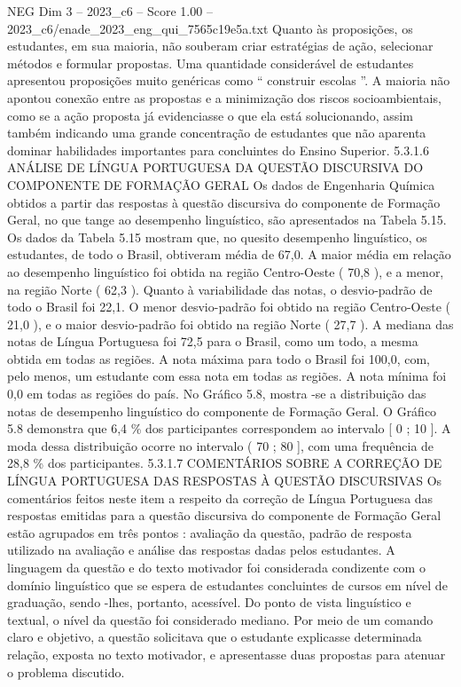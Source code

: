 \begin{textsample}{NEG Dim 3 – 2023\_c6 – Score 1.00 – 2023\_c6/enade\_2023\_eng\_qui\_7565c19e5a.txt}
Quanto às proposições, os estudantes, em sua maioria, não souberam criar estratégias de ação, selecionar métodos e formular propostas.
Uma quantidade considerável de estudantes apresentou proposições muito genéricas como “ construir escolas ”.
A maioria não apontou conexão entre as propostas e a minimização dos riscos socioambientais, como se a ação proposta já evidenciasse o que ela está solucionando, assim também indicando uma grande concentração de estudantes que não aparenta dominar habilidades importantes para concluintes do Ensino Superior. 5.3.1.6 ANÁLISE DE LÍNGUA PORTUGUESA DA QUESTÃO DISCURSIVA DO COMPONENTE DE FORMAÇÃO GERAL Os dados de Engenharia Química obtidos a partir das respostas à questão discursiva do componente de Formação Geral, no que tange ao desempenho linguístico, são apresentados na Tabela 5.15.
Os dados da Tabela 5.15 mostram que, no quesito desempenho linguístico, os estudantes, de todo o Brasil, obtiveram média de 67,0.
A maior média em relação ao desempenho linguístico foi obtida na região Centro-Oeste ( 70,8 ), e a menor, na região Norte ( 62,3 ).
Quanto à variabilidade das notas, o desvio-padrão de todo o Brasil foi 22,1.
O menor desvio-padrão foi obtido na região Centro-Oeste ( 21,0 ), e o maior desvio-padrão foi obtido na região Norte ( 27,7 ).
A mediana das notas de Língua Portuguesa foi 72,5 para o Brasil, como um todo, a mesma obtida em todas as regiões.
A nota máxima para todo o Brasil foi 100,0, com, pelo menos, um estudante com essa nota em todas as regiões.
A nota mínima foi 0,0 em todas as regiões do país.
No Gráfico 5.8, mostra -se a distribuição das notas de desempenho linguístico do componente de Formação Geral.
O Gráfico 5.8 demonstra que 6,4 \% dos participantes correspondem ao intervalo [ 0 ; 10 ].
A moda dessa distribuição ocorre no intervalo ( 70 ; 80 ], com uma frequência de 28,8 \% dos participantes. 5.3.1.7 COMENTÁRIOS SOBRE A CORREÇÃO DE LÍNGUA PORTUGUESA DAS RESPOSTAS À QUESTÃO DISCURSIVAS Os comentários feitos neste item a respeito da correção de Língua Portuguesa das respostas emitidas para a questão discursiva do componente de Formação Geral estão agrupados em três pontos : avaliação da questão, padrão de resposta utilizado na avaliação e análise das respostas dadas pelos estudantes.
A linguagem da questão e do texto motivador foi considerada condizente com o domínio linguístico que se espera de estudantes concluintes de cursos em nível de graduação, sendo -lhes, portanto, acessível.
Do ponto de vista linguístico e textual, o nível da questão foi considerado mediano.
Por meio de um comando claro e objetivo, a questão solicitava que o estudante explicasse determinada relação, exposta no texto motivador, e apresentasse duas propostas para atenuar o problema discutido.

\end{textsample}
